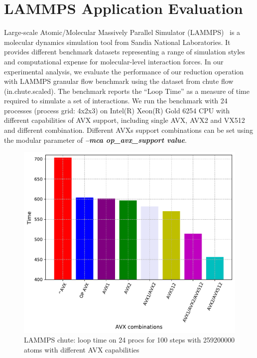 \documentclass[5p,times,twocolumn]{elsarticle}
\begin{document}
\section{LAMMPS Application Evaluation}\label{sec:hpcapplication}
Large-scale Atomic/Molecular Massively Parallel Simulator (LAMMPS)~\cite{PLIMPTON19951} is a
molecular dynamics simulation tool from Sandia National Laboratories.
It provides different benchmark datasets representing a range of simulation styles
and computational expense for molecular-level interaction forces.
In our experimental analysis, we evaluate the performance of our reduction
operation with LAMMPS granular flow benchmark
using the dataset from chute flow (in.chute.scaled).
The benchmark reports the “Loop Time” as a measure of
time required to simulate a set of interactions.
We run the benchmark with 24 processes (process
grid: 4x2x3) on Intel(R) Xeon(R) Gold 6254 CPU with different
capabilities of AVX support, including single AVX, AVX2 and VX512
and different combination. Different AVXs support combinations can be set using
the modular parameter of \emph{\textbf{\textit{--mca op_avx_support value}}}.

\begin{figure}[h]
    \centering
    \includegraphics[width=\linewidth]{lammps_avx.pdf}
    \caption{LAMMPS chute: loop time on 24 procs for 100 steps with 259200000 atoms with different AVX capabilities}
    \label{fig:lammpsavx}
\end{figure}
\end{document}
